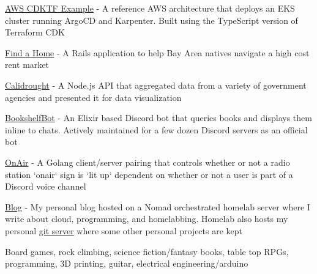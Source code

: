 \begin{cventries}
  \cventry
    {}
    {}
    {}
    {}
    {
      \begin{cvitems}
        \item
          {\href{https://github.com/howdoicomputer/aws-cdktf-example}{AWS CDKTF Example} - A reference AWS architecture that deploys an EKS cluster running ArgoCD and Karpenter. Built using the TypeScript version of Terraform CDK}
        \item {\href{https://github.com/codeforsanjose/findahome}{Find a Home} - A Rails application to help Bay Area natives navigate a high cost rent market}
        \item
        {\href{https://github.com/codeforsanjose/calidrought-legacy}{Calidrought} - A Node.js API that aggregated data from a variety of government agencies and presented it for data visualization}
        \item
        {\href{https://github.com/howdoicomputer/bookshelfbot}{BookshelfBot} - An Elixir based Discord bot that queries books and displays them inline to chats. Actively maintained for a few dozen Discord servers as an official bot}
        \item
        {\href{https://github.com/howdoicomputer/onair}{OnAir} - A Golang client/server pairing that controls whether or not a radio station `onair` sign is `lit up` dependent on whether or not a user is part of a Discord voice channel}
        \item
        {\href{https://howdoicomputer.lol}{Blog} - My personal blog hosted on a Nomad orchestrated homelab server where I write about cloud, programming, and homelabbing. Homelab also hosts my personal \href{https://git.howdoicomputer.lol/}{git server} where some other personal projects are kept}
      \end{cvitems}
    }
\end{cventries}

\begin{cventries}
  \cventry
    {}
    {}
    {}
    {}
    {
      \begin{cvitems}
        \item {Board games, rock climbing, science fiction/fantasy books, table top RPGs, programming, 3D printing, guitar, electrical engineering/arduino}
      \end{cvitems}
    }
\end{cventries}

